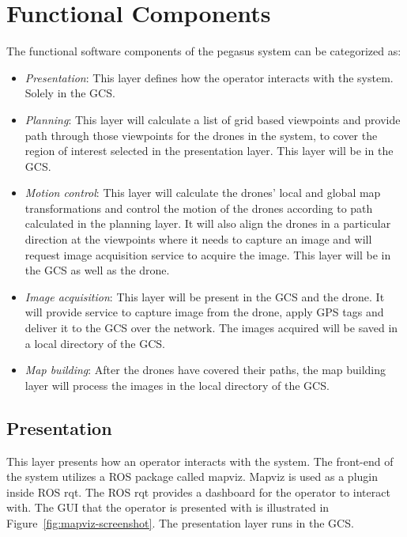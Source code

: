 \section{Functional Components}
The functional software components of the pegasus system can be categorized as:
\begin{itemize}
	\item \textit{Presentation}: This layer defines how the operator interacts with the system. Solely in the GCS.
	\item \textit{Planning}: This layer will calculate a list of grid based viewpoints and provide path through those viewpoints for the drones in the system, to cover the region of interest selected in the presentation layer. This layer will be in the GCS. 
	\item \textit{Motion control}: This layer will calculate the drones' local and global map transformations and control the motion of the drones according to path calculated in the planning layer. It will also align the drones in a particular direction at the viewpoints where it needs to capture an image and will request image acquisition service to acquire the image. This layer will be in the GCS as well as the drone.
	\item \textit{Image acquisition}:  This layer will be present in the GCS and the drone. It will provide service to capture image from the drone, apply GPS tags and deliver it to the GCS over the network. The images acquired will be saved in a local directory of the GCS.
	\item \textit{Map building}: After the drones have covered their paths, the map building layer will process the images in the local directory of the GCS.
\end{itemize}

\subsection{Presentation}

This layer presents how an operator interacts with the system. The front-end of the system utilizes a ROS package called mapviz. Mapviz is used as a plugin inside ROS rqt. The ROS rqt provides a dashboard for the operator to interact with. The GUI that the operator is presented with is illustrated in Figure~\ref{fig:mapviz-screenshot}. The presentation layer runs in the GCS.

